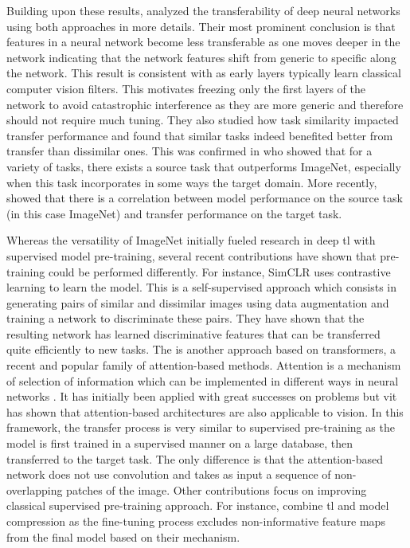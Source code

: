 Building upon these results, \cite{yosinski2014transferable} analyzed the
transferability of deep neural networks using both approaches in more details.
Their most prominent conclusion is that features in a neural network become less
transferable as one moves deeper in the network indicating that the network features
shift from generic to specific along the network. This result is consistent with
\cite{zeiler2014visualizing} as early layers typically learn classical computer
vision filters. This motivates freezing only the first layers of the network to
avoid catastrophic interference as they are more generic and therefore should not
require much tuning. They also studied how task similarity impacted transfer
performance and found that similar tasks indeed benefited better from transfer
than dissimilar ones. This was confirmed in \cite{mensink2021factors} who 
showed that for a variety of tasks, there exists a source task that outperforms
ImageNet, especially when this task incorporates in some ways the target domain.
More recently, \cite{kornblith2019better} showed that there is a correlation 
between model performance on the source task (in this case  ImageNet) and transfer 
performance on the target task. 

Whereas the versatility of ImageNet initially fueled research in deep \acrlong{tl}
with supervised model pre-training, several recent contributions have shown that
pre-training could be performed differently. For instance, SimCLR \cite{chen2020simple}
uses contrastive learning to learn the model. This is a self-supervised approach
which consists in generating pairs of similar and dissimilar images using data
augmentation and training a network to discriminate these pairs. They have shown
that the resulting network has learned discriminative features that can be transferred
quite efficiently to new tasks. The  \cite{dosovitskiy2020image}
is another approach based on transformers, a recent and popular family of
attention-based methods. Attention is a mechanism of selection of information
which can be implemented in different ways in neural networks \cite{niu2021review}.
It has initially been applied with great successes on  problems
but \acrshort{vit} has shown that attention-based architectures are also applicable
to vision. In this framework, the transfer process is very similar to supervised
pre-training as the model is first trained in a supervised manner on a large
database, then transferred to the target task. The only difference is that the
attention-based network does not use convolution and takes as input a sequence of
non-overlapping patches of the image. Other contributions focus on improving
classical supervised pre-training approach. For instance, \cite{wang2019pay}
combine \acrlong{tl} and model compression as the fine-tuning process excludes
non-informative feature maps from the final model based on their 
mechanism.

